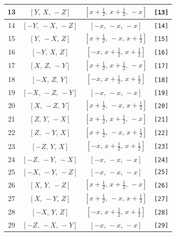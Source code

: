 \documentclass[fleqn,8pt]{jsarticle}
\begin{document}
\begin{longtable}{cccc}
13 & $\left[ Y,\, X,\, - Z \right]$ & $\left[ x + \frac{1}{2},\, x + \frac{1}{2},\, - x \right]$ & {\tt [13]} \\ \hline
14 & $\left[ - Y,\, - X,\, - Z \right]$ & $\left[ - x,\, - x,\, - x \right]$ & {\tt [14]} \\ \hline
15 & $\left[ Y,\, - X,\, Z \right]$ & $\left[ x + \frac{1}{2},\, - x,\, x + \frac{1}{2} \right]$ & {\tt [15]} \\ \hline
16 & $\left[ - Y,\, X,\, Z \right]$ & $\left[ - x,\, x + \frac{1}{2},\, x + \frac{1}{2} \right]$ & {\tt [16]} \\ \hline
17 & $\left[ X,\, Z,\, - Y \right]$ & $\left[ x + \frac{1}{2},\, x + \frac{1}{2},\, - x \right]$ & {\tt [17]} \\ \hline
18 & $\left[ - X,\, Z,\, Y \right]$ & $\left[ - x,\, x + \frac{1}{2},\, x + \frac{1}{2} \right]$ & {\tt [18]} \\ \hline
19 & $\left[ - X,\, - Z,\, - Y \right]$ & $\left[ - x,\, - x,\, - x \right]$ & {\tt [19]} \\ \hline
20 & $\left[ X,\, - Z,\, Y \right]$ & $\left[ x + \frac{1}{2},\, - x,\, x + \frac{1}{2} \right]$ & {\tt [20]} \\ \hline
21 & $\left[ Z,\, Y,\, - X \right]$ & $\left[ x + \frac{1}{2},\, x + \frac{1}{2},\, - x \right]$ & {\tt [21]} \\ \hline
22 & $\left[ Z,\, - Y,\, X \right]$ & $\left[ x + \frac{1}{2},\, - x,\, x + \frac{1}{2} \right]$ & {\tt [22]} \\ \hline
23 & $\left[ - Z,\, Y,\, X \right]$ & $\left[ - x,\, x + \frac{1}{2},\, x + \frac{1}{2} \right]$ & {\tt [23]} \\ \hline
24 & $\left[ - Z,\, - Y,\, - X \right]$ & $\left[ - x,\, - x,\, - x \right]$ & {\tt [24]} \\ \hline
25 & $\left[ - X,\, - Y,\, - Z \right]$ & $\left[ - x,\, - x,\, - x \right]$ & {\tt [25]} \\ \hline
26 & $\left[ X,\, Y,\, - Z \right]$ & $\left[ x + \frac{1}{2},\, x + \frac{1}{2},\, - x \right]$ & {\tt [26]} \\ \hline
27 & $\left[ X,\, - Y,\, Z \right]$ & $\left[ x + \frac{1}{2},\, - x,\, x + \frac{1}{2} \right]$ & {\tt [27]} \\ \hline
28 & $\left[ - X,\, Y,\, Z \right]$ & $\left[ - x,\, x + \frac{1}{2},\, x + \frac{1}{2} \right]$ & {\tt [28]} \\ \hline
29 & $\left[ - Z,\, - X,\, - Y \right]$ & $\left[ - x,\, - x,\, - x \right]$ & {\tt [29]} \\ \hline

\end{longtable}
\end{document}
